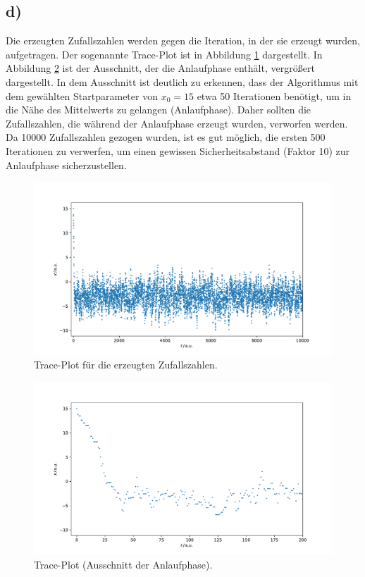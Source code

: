 \documentclass[a4paper, 11pt]{article}
\begin{document}
\subsection*{d)}
Die erzeugten Zufallszahlen werden gegen die Iteration, in der sie erzeugt wurden,
aufgetragen. Der sogenannte Trace-Plot ist in Abbildung \ref{fig:trace} dargestellt.
In Abbildung \ref{fig:trace-zoom} ist der Ausschnitt, der die Anlaufphase enthält,
vergrößert dargestellt. In dem Ausschnitt ist deutlich zu erkennen, dass der
Algorithmus mit dem gewählten Startparameter von $x_0 = 15$ etwa 50 Iterationen
benötigt, um in die Nähe des Mittelwerts zu gelangen (Anlaufphase). Daher sollten
die Zufallszahlen, die während der Anlaufphase erzeugt wurden, verworfen werden.
Da 10000 Zufallszahlen gezogen wurden, ist es gut möglich, die ersten 500 Iterationen
zu verwerfen, um einen gewissen Sicherheitsabstand (Faktor 10) zur Anlaufphase
sicherzustellen.
\begin{figure}
  \centering
  \includegraphics[width=\textwidth]{../A15/A15d}
  \caption{Trace-Plot für die erzeugten Zufallszahlen.}
  \label{fig:trace}
\end{figure}
\begin{figure}
  \centering
  \includegraphics[width=\textwidth]{../A15/A15d_zoom}
  \caption{Trace-Plot (Ausschnitt der Anlaufphase).}
  \label{fig:trace-zoom}
\end{figure}


\end{document}
